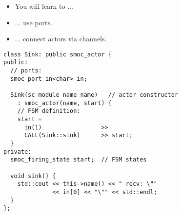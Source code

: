 \begin{frame}
\begin{itemize}
\item You will learn to ...
\item ... use ports.
\item ... connect actors via channels.
\end{itemize}
\end{frame}




\begin{frame}[fragile=singleslide]
\begin{lstlisting}
class Sink: public smoc_actor {
public:
  // ports:
  smoc_port_in<char> in;

  Sink(sc_module_name name)   // actor constructor
    : smoc_actor(name, start) {
    // FSM definition:
    start =
      in(1)                 >>
      CALL(Sink::sink)      >> start;
  }
private:
  smoc_firing_state start;  // FSM states

  void sink() {
    std::cout << this->name() << " recv: \""
              << in[0] << "\"" << std::endl;
  }
};
\end{lstlisting}
\end{frame}







